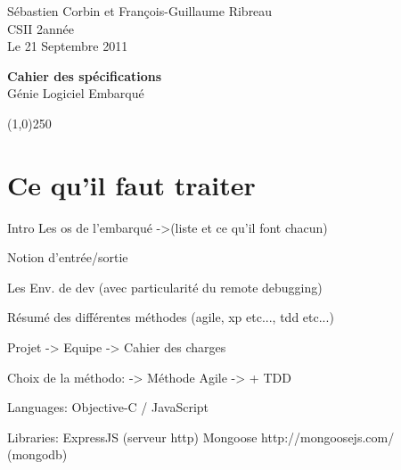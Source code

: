 \documentclass[a4paper,12pt]{report}
\begin{document}
  \begin{onehalfspace}

    \begin{titlepage}
      \begin{center}
        Sébastien Corbin et François-Guillaume Ribreau\\
        CSII 2\ieme année\\
        Le 21 Septembre 2011\\
      \end{center}
      \hrulefill
      \vspace{7cm}
      \begin{center}
        \LARGE \textbf{Cahier des spécifications}\\
        \vspace{3cm}
        \normalsize Génie Logiciel Embarqué
      \end{center}

      \vspace{9,5cm}

      \begin{center}
      \line(1,0){250}
      \end{center}

      \begin{center}
      \tiny{\currfilename}
      \end{center}


    \end{titlepage}
    \clearpage

  \thispagestyle{empty}
  \setcounter{page}{0}
  \clearpage

\chapter*{Ce qu'il faut traiter}
Intro
  Les os de l'embarqué
  ->(liste et ce qu'il font chacun)

  Notion d'entrée/sortie

  Les Env. de dev (avec particularité du remote debugging)

  Résumé des différentes méthodes (agile, xp etc..., tdd etc...)

Projet
  -> Equipe
  -> Cahier des charges

Choix de la méthodo:
  -> Méthode Agile
  -> + TDD

Languages:
Objective-C / JavaScript

Libraries:
ExpressJS (serveur http)
Mongoose http://mongoosejs.com/ (mongodb)


\end{onehalfspace}
\end{document}

